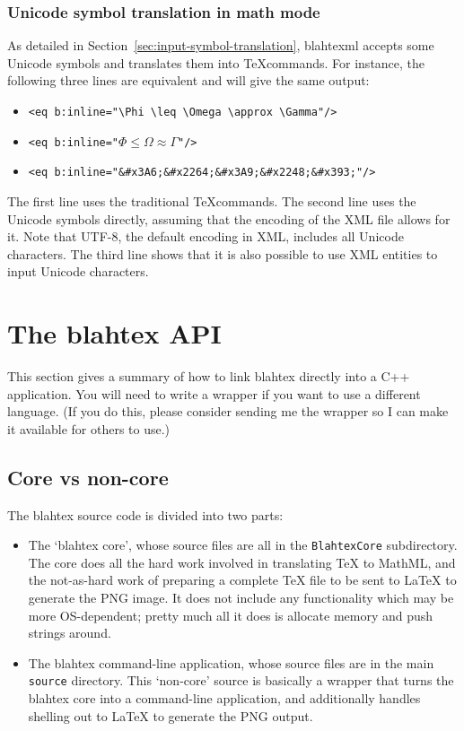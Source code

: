 \documentclass{article}
\begin{document}
\subsubsection{Unicode symbol translation in math mode}\label{sec:blahtexml-input-symbol-translation}

As detailed in Section~\ref{sec:input-symbol-translation}, blahtexml accepts some Unicode symbols and translates them into \TeX commands. For instance, the following three lines are equivalent and will give the same output:
\begin{itemize}
\item \verb|<eq b:inline="\Phi \leq \Omega \approx \Gamma"/>|
\item \verb|<eq b:inline="|$\Phi \leq \Omega \approx \Gamma$\verb|"/>|
\item \verb|<eq b:inline="&#x3A6;&#x2264;&#x3A9;&#x2248;&#x393;"/>|
\end{itemize}

The first line uses the traditional \TeX commands. The second line uses the Unicode symbols directly, assuming that the encoding of the XML file allows for it. Note that UTF-8, the default encoding in XML, includes all Unicode characters. The third line shows that it is also possible to use XML entities to input Unicode characters.

\section{The blahtex API}\label{sec:API}

This section gives a summary of how to link blahtex directly into a C++ application. You will need to write a wrapper if you want to use a different language. (If you do this, please consider sending me the wrapper so I can make it available for others to use.)

\subsection{Core vs non-core}

The blahtex source code is divided into two parts:
\begin{itemize}
\item The `blahtex core', whose source files are all in the \texttt{BlahtexCore} subdirectory. The core does all the hard work involved in translating \TeX{} to MathML, and the not-as-hard work of preparing a complete \TeX{} file to be sent to \LaTeX{} to generate the PNG image. It does not include any functionality which may be more OS-dependent; pretty much all it does is allocate memory and push strings around. 
\item The blahtex command-line application, whose source files are in the main \texttt{source} directory. This `non-core' source is basically a wrapper that turns the blahtex core into a command-line application, and additionally handles shelling out to \LaTeX{} to generate the PNG output.
\end{itemize}
\end{document}
